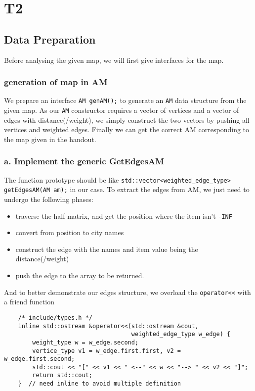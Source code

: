 \section{T2}

\subsection{Data Preparation}
Before analysing the given map, we will first give interfaces for the map.

\subsubsection*{generation of map in \textbf{AM}}

We prepare an interface \texttt{AM genAM();} to generate an \verb|AM| data structure from the given map. As our \verb|AM| constructor requires a vector of vertices and a vector of edges with distance(/weight), we simply construct the two vectors by pushing all vertices and weighted edges. Finally we can get the correct AM corresponding to the map given in the handout.

\subsubsection*{a. Implement the generic \textbf{GetEdgesAM}}

The function prototype should be like \texttt{std::vector<weighted_edge_type> getEdgesAM(AM am);} in our case. To extract the edges from AM, we just need to undergo the following phases:
\begin{itemize}
    \item traverse the half matrix, and get the position where the item isn't \verb|-INF|
    \item convert from position to city names
    \item construct the edge with the names and item value being the distance(/weight)
    \item push the edge to the array to be returned.
\end{itemize}

And to better demonstrate our edges structure, we overload the \verb|operator<<| with a friend function 
\begin{verbatim}
    /* include/types.h */
    inline std::ostream &operator<<(std::ostream &cout, 
                                    weighted_edge_type w_edge) {
        weight_type w = w_edge.second;
        vertice_type v1 = w_edge.first.first, v2 = w_edge.first.second;
        std::cout << "[" << v1 << " <--" << w << "--> " << v2 << "]";
        return std::cout;
    }  // need inline to avoid multiple definition
\end{verbatim}


